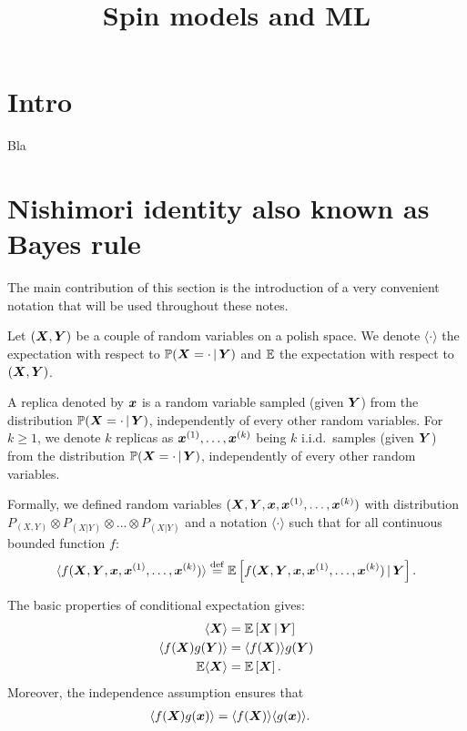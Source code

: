 \documentclass[12pt,nocut]{article}
\title{Spin models and ML}
\date{}
\begin{document}
\maketitle{}

\section{Intro}
Bla

\section{Nishimori identity also known as Bayes rule}

The main contribution of this section is the introduction of a very convenient notation that will be used throughout these notes. 

\begin{definition}\label{def:setup-nishimori}
Let $({\boldsymbol X},{\boldsymbol Y})$ be a couple of random variables on a polish space. We denote $\langle \cdot \rangle$ the expectation with respect to $\mathbb{P}({\boldsymbol X}=\cdot \, | \, {\boldsymbol Y})$ and $\mathbb{E}$ the expectation with respect to $({\boldsymbol X},{\boldsymbol Y})$.

A replica denoted by ${\boldsymbol x}$ is a random variable sampled (given ${\boldsymbol Y}$) from the distribution $\mathbb{P}({\boldsymbol X}=\cdot \, | \, {\boldsymbol Y})$, independently of every other random variables. For $k \geq 1$, we denote $k$ replicas as ${\boldsymbol x}^{(1)}, \dots, {\boldsymbol x}^{(k)}$ being $k$ i.i.d.\ samples (given ${\boldsymbol Y}$) from the distribution $\mathbb{P}({\boldsymbol X}=\cdot \, | \, {\boldsymbol Y})$, independently of every other random variables.
\end{definition}

Formally, we defined random variables $({\boldsymbol X},{\boldsymbol Y},{\boldsymbol x},{\boldsymbol x}^{(1)}, \dots, {\boldsymbol x}^{(k)})$ with distribution $P_{(X,Y)}\!\otimes \! P_{(X|Y)}\!\otimes \!\dots \!\otimes \! P_{(X|Y)}$ and a notation $\langle \cdot \rangle$ such that for all continuous bounded function $f$:
$$
\langle f({\boldsymbol X},{\boldsymbol Y},{\boldsymbol x},{\boldsymbol x}^{(1)}, \dots, {\boldsymbol x}^{(k)}) \rangle \overset{{\rm def}}{=} \mathbb{E} \left[ f({\boldsymbol X},{\boldsymbol Y},{\boldsymbol x},{\boldsymbol x}^{(1)}, \dots, {\boldsymbol x}^{(k)}) \, | \, {\boldsymbol Y} \right].
$$

The basic properties of conditional expectation gives:
\begin{align*}
\langle {\boldsymbol X} \rangle &= \mathbb{E}\left[ {\boldsymbol X} \, | \, {\boldsymbol Y} \right]\\
\langle f({\boldsymbol X})g({\boldsymbol Y}) \rangle &= \langle f({\boldsymbol X})\rangle g({\boldsymbol Y})\\
\mathbb{E} \langle {\boldsymbol X} \rangle &= \mathbb{E} \left[ {\boldsymbol X} \right].
\end{align*}
Moreover, the independence assumption ensures that
\begin{align*}
\langle f({\boldsymbol X})g({\boldsymbol x}) \rangle &= \langle f({\boldsymbol X})\rangle \langle g({\boldsymbol x})\rangle.
\end{align*}
\end{document}
